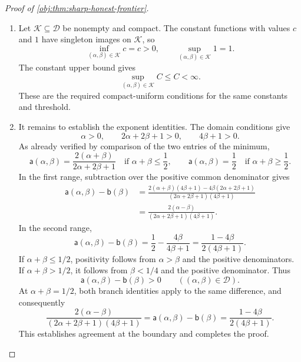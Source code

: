 \documentclass[11pt]{article}
\begin{document}
\begin{proof}[Proof of \cref{obj:thm:sharp-honest-frontier}]
\begin{enumerate}
\item Let \(\mathcal K\subseteq\mathcal D\) be nonempty and compact. The constant
functions with values \(c\) and \(1\) have singleton images on \(\mathcal K\), so
\[
\inf_{(\alpha,\beta)\in\mathcal K}c=c>0,
\qquad
\sup_{(\alpha,\beta)\in\mathcal K}1=1.
\]
The constant upper bound gives
\[
\sup_{(\alpha,\beta)\in\mathcal K}C\le C<\infty.
\]
These are the required compact-uniform conditions for the same constants
and threshold.

\item It remains to establish the exponent identities. The domain conditions give
\[
\alpha>0,\qquad
2\alpha+2\beta+1>0,\qquad
4\beta+1>0.
\]
As already verified by comparison of the two entries of the minimum,
\[
\mathsf a(\alpha,\beta)
=
\frac{2(\alpha+\beta)}{2\alpha+2\beta+1}
\quad\text{if }\alpha+\beta\le\frac12,
\qquad
\mathsf a(\alpha,\beta)=\frac12
\quad\text{if }\alpha+\beta\ge\frac12.
\]
In the first range, subtraction over the positive common denominator gives
\[
\begin{aligned}
\mathsf a(\alpha,\beta)-\mathsf b(\beta)
&=
\frac{
2(\alpha+\beta)(4\beta+1)
-4\beta(2\alpha+2\beta+1)}
{(2\alpha+2\beta+1)(4\beta+1)}\\
&=
\frac{2(\alpha-\beta)}
{(2\alpha+2\beta+1)(4\beta+1)}.
\end{aligned}
\]
In the second range,
\[
\mathsf a(\alpha,\beta)-\mathsf b(\beta)
=
\frac12-\frac{4\beta}{4\beta+1}
=
\frac{1-4\beta}{2(4\beta+1)}.
\]
If \(\alpha+\beta\le1/2\), positivity follows from \(\alpha>\beta\) and
the positive denominators. If \(\alpha+\beta>1/2\), it follows from
\(\beta<1/4\) and the positive denominator. Thus
\[
\mathsf a(\alpha,\beta)-\mathsf b(\beta)>0
\qquad((\alpha,\beta)\in\mathcal D).
\]
At \(\alpha+\beta=1/2\), both branch identities apply to the same difference,
and consequently
\[
\frac{2(\alpha-\beta)}
{(2\alpha+2\beta+1)(4\beta+1)}
=
\mathsf a(\alpha,\beta)-\mathsf b(\beta)
=
\frac{1-4\beta}{2(4\beta+1)}.
\]
This establishes agreement at the boundary and completes the proof.
\end{enumerate}
\end{proof}
\end{document}
